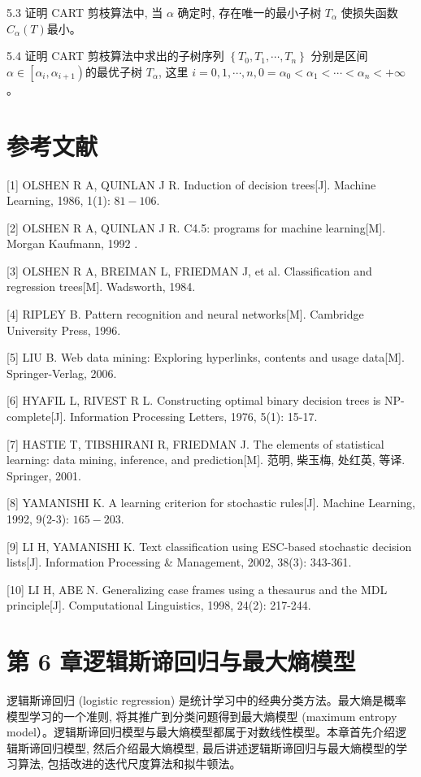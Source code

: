 \documentclass[10pt]{article}
\begin{document}
\begin{CJK*}{UTF8}{bsmi}
5.3 证明 CART 剪枝算法中, 当 $\alpha$ 确定时, 存在唯一的最小子树 $T_{\alpha}$ 使损失函数 $C_{\alpha}(T)$最小。

5.4 证明 CART 剪枝算法中求出的子树序列 $\left\{T_{0}, T_{1}, \cdots, T_{n}\right\}$ 分别是区间 $\alpha \in\left[\alpha_{i}, \alpha_{i+1}\right)$的最优子树 $T_{\alpha}$, 这里 $i=0,1, \cdots, n, 0=\alpha_{0}<\alpha_{1}<\cdots<\alpha_{n}<+\infty$ 。

\section*{参考文献}
[1] OLSHEN R A, QUINLAN J R. Induction of decision trees[J]. Machine Learning, 1986, 1(1): $81-106$.

[2] OLSHEN R A, QUINLAN J R. C4.5: programs for machine learning[M]. Morgan Kaufmann, 1992 .

[3] OLSHEN R A, BREIMAN L, FRIEDMAN J, et al. Classification and regression trees[M]. Wadsworth, 1984.

[4] RIPLEY B. Pattern recognition and neural networks[M]. Cambridge University Press, 1996.

[5] LIU B. Web data mining: Exploring hyperlinks, contents and usage data[M]. Springer-Verlag, 2006.

[6] HYAFIL L, RIVEST R L. Constructing optimal binary decision trees is NP-complete[J]. Information Processing Letters, 1976, 5(1): 15-17.

[7] HASTIE T, TIBSHIRANI R, FRIEDMAN J. The elements of statistical learning: data mining, inference, and prediction[M]. 范明, 柴玉梅, 处红英, 等译. Springer, 2001.

[8] YAMANISHI K. A learning criterion for stochastic rules[J]. Machine Learning, 1992, 9(2-3): $165-203$.

[9] LI H, YAMANISHI K. Text classification using ESC-based stochastic decision lists[J]. Information Processing \& Management, 2002, 38(3): 343-361.

[10] LI H, ABE N. Generalizing case frames using a thesaurus and the MDL principle[J]. Computational Linguistics, 1998, 24(2): 217-244.

\section*{第 6 章逻辑斯谛回归与最大熵模型}
逻辑斯谛回归 (logistic regression) 是统计学习中的经典分类方法。最大熵是概率模型学习的一个准则, 将其推广到分类问题得到最大熵模型 (maximum entropy model）。逻辑斯谛回归模型与最大熵模型都属于对数线性模型。本章首先介绍逻辑斯谛回归模型, 然后介绍最大熵模型, 最后讲述逻辑斯谛回归与最大熵模型的学习算法, 包括改进的迭代尺度算法和拟牛顿法。


\end{CJK*}
\end{document}
